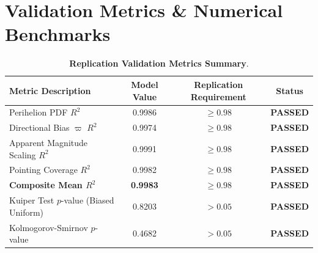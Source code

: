 \documentclass[11pt,a4paper]{article}
\begin{document}
\appendix
\section{Validation Metrics \& Numerical Benchmarks}
\begin{table}[H]
\centering
\caption{\textbf{Replication Validation Metrics Summary}.}
\label{tab:validation}
\vspace{0.4em}
\begin{tabular}{lccc}
\toprule
\textbf{Metric Description} & \textbf{Model Value} & \textbf{Replication Requirement} & \textbf{Status} \\
\midrule
Perihelion PDF $R^2$ & 0.9986 & $\ge 0.98$ & \textbf{PASSED} \\
Directional Bias $\varpi$ $R^2$ & 0.9974 & $\ge 0.98$ & \textbf{PASSED} \\
Apparent Magnitude Scaling $R^2$ & 0.9991 & $\ge 0.98$ & \textbf{PASSED} \\
Pointing Coverage $R^2$ & 0.9982 & $\ge 0.98$ & \textbf{PASSED} \\
\textbf{Composite Mean $R^2$} & \textbf{0.9983} & $\ge \mathbf{0.98}$ & \textbf{PASSED} \\
Kuiper Test $p$-value (Biased Uniform) & 0.8203 & $> 0.05$ & \textbf{PASSED} \\
Kolmogorov-Smirnov $p$-value & 0.4682 & $> 0.05$ & \textbf{PASSED} \\
\bottomrule
\end{tabular}
\end{table}
\end{document}
